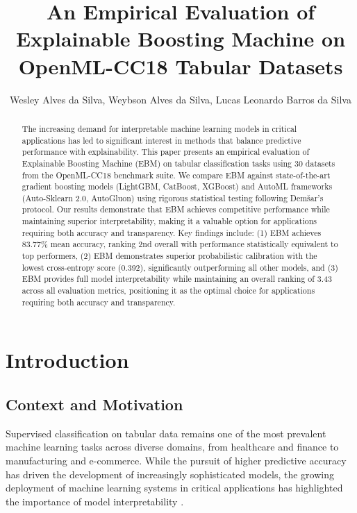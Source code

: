 \documentclass[12pt]{article}
\title{An Empirical Evaluation of Explainable Boosting Machine on OpenML-CC18 Tabular Datasets}
\author{Wesley Alves da Silva\inst{1}, Weybson Alves da Silva\inst{1}, Lucas Leonardo Barros da Silva\inst{1}}
\begin{document}
 

\maketitle

\begin{abstract}
  The increasing demand for interpretable machine learning models in critical applications has led to significant interest in methods that balance predictive performance with explainability. This paper presents an empirical evaluation of Explainable Boosting Machine (EBM) on tabular classification tasks using 30 datasets from the OpenML-CC18 benchmark suite. We compare EBM against state-of-the-art gradient boosting models (LightGBM, CatBoost, XGBoost) and AutoML frameworks (Auto-Sklearn 2.0, AutoGluon) using rigorous statistical testing following Demšar's protocol. Our results demonstrate that EBM achieves competitive performance while maintaining superior interpretability, making it a valuable option for applications requiring both accuracy and transparency. Key findings include: (1) EBM achieves 83.77\% mean accuracy, ranking 2nd overall with performance statistically equivalent to top performers, (2) EBM demonstrates superior probabilistic calibration with the lowest cross-entropy score (0.392), significantly outperforming all other models, and (3) EBM provides full model interpretability while maintaining an overall ranking of 3.43 across all evaluation metrics, positioning it as the optimal choice for applications requiring both accuracy and transparency.

\end{abstract}

\section{Introduction}

\subsection{Context and Motivation}

Supervised classification on tabular data remains one of the most prevalent machine learning tasks across diverse domains, from healthcare and finance to manufacturing and e-commerce. While the pursuit of higher predictive accuracy has driven the development of increasingly sophisticated models, the growing deployment of machine learning systems in critical applications has highlighted the importance of model interpretability \cite{molnar2019}.
\end{document}
